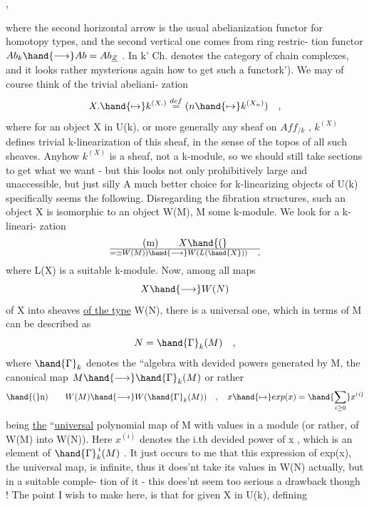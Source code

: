 
,

where the second horizontal arrow is the usual abelianization functor
for homotopy types,  and the second vertical one comes from ring restric-%
tion functor  $Ab_k \hand{\longrightarrow} Ab = Ab_{\underline{Z}}$ .  In \hand{(}k'\hand{),} Ch.  denotes the category
of chain complexes,  and it looks rather mysterious again how to get
such a functor\hand{(}k').   We may of course think of the trivial abeliani-%
zation
\[ X. \hand{\mapsto} k^{(X.)} \stackrel{def}{=} (n \hand{\mapsto} k^{(X_n)} ) \quad , \]
where for an object X in U(k),  or more generally any sheaf on $Aff_{/k}$ ,
$k^{(X)}$ defines trivial k-linearization of this sheaf,  in the sense of the
topos of all such sheaves.  Anyhow $k^{(X)}$ is a sheaf,  not a k-module,
so we should still take sections to get what we want  -  but this  looks
not only prohibitively large and unaccessible,  but just silly\hand{!}  A much
better choice for k-linearizing objects of U(k) specifically seems the
following.  Disregarding the fibration structures,  such an object X is
isomorphic to an object W(M),  M some k-module.  We look for a k-lineari-%
zation
\[ \text{(m)} \qquad X \hand{(}\over{=}{\simeq}W(M)) \hand{\longrightarrow} W(L(\hand{X})) \quad , \]
where L(X) is a suitable k-module.  Now,  among all maps
\[ X \hand{\longrightarrow} W(N) \]
 of X into sheaves \uline{of the type} W(N),  there is a universal one,  which
in terms of M can be described as
\[ N = \hand{\Gamma}_k(M) \quad , \]
where $\hand{\Gamma}_k$  denotes the ``algebra with devided powers generated by M,
the canonical map  $M \hand{\longrightarrow} \hand{\Gamma}_k(M)$  or rather
\[ \hand{(}\text{n}) \qquad W(M) \hand{\longrightarrow} W(\hand{\Gamma}_k(M)) \quad , \quad x \hand{\mapsto} exp(x) = \hand{\sum_{i\geq 0}} x^{(i)} \]
being \uline{the} ``\uline{universal} polynomial map  of M with values in a module 
(or rather,  of W(M) into W(N)).   Here  $x^{(i)}$ denotes the i.th devided
power of x ,  which is an element of  $\hand{\Gamma}_k^{\,i}(M)$ .  It just occurs to me
that this expression of exp(x),  the universal map,  is infinite,  thus
it does'nt take its values in W(N)  actually,  but in a suitable comple-%
tion of it - this does'nt seem too serious a drawback though !  The
point I wish to make here,  is that for given X in U(k),  defining


